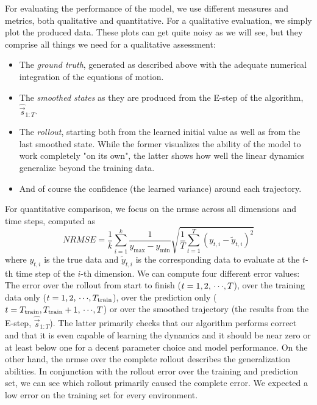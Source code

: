 	For evaluating the performance of the model, we use different measures and metrics, both qualitative and quantitative. For a qualitative evaluation, we simply plot the produced data. These plots can get quite noisy as we will see, but they comprise all things we need for a qualitative assessment:
	\begin{itemize}
		\item The \emph{ground truth}, generated as described above with the adequate numerical integration of the equations of motion.
		\item The \emph{smoothed states} as they are produced from the E-step of the \algname algorithm, \ie \(\hat{\vec{s}}_{1:T}\).
		\item The \emph{rollout}, starting both from the learned initial value as well as from the last smoothed state. While the former visualizes the ability of the model to work completely "on its own", the latter shows how well the linear dynamics generalize beyond the training data.
		\item And of course the confidence (\ie the learned variance) around each trajectory.
	\end{itemize}
	For quantitative comparison, we focus on the \ac{nrmse} across all dimensions and time steps, computed as
	\begin{equation*}
		\mathit{NRMSE} = \frac{1}{k} \sum_{i = 1}^{k} \frac{1}{y_\mathrm{max} - y_\mathrm{min}} \sqrt{ \frac{1}{T} \sum_{t = 1}^{T} (y_{t, i} - \tilde{y}_{t, i})^2 }
	\end{equation*}
	where \( y_{t, i} \) is the true data and \( \tilde{y}_{t, i} \) is the corresponding data to evaluate at the \(t\)-th time step of the \(i\)-th dimension. We can compute four different error values: The error over the rollout from start to finish (\( t = 1, 2, \,\cdots\!, T \)), over the training data only (\( t = 1, 2, \,\cdots\!, T_{\mathrm{train}} \)), over the prediction only (\( t = T_{\mathrm{train}}, T_{\mathrm{train}} + 1, \,\cdots\!, T \)) or over the smoothed trajectory (\ie the results from the E-step, \(  \hat{\vec{s}}_{1:T} \)). The latter primarily checks that our algorithm performs correct and that it is even capable of learning the dynamics and it should be near zero or at least below one for a decent parameter choice and model performance. On the other hand, the \ac{nrmse} over the complete rollout describes the generalization abilities. In conjunction with the rollout error over the training and prediction set, we can see which rollout primarily caused the complete error. We expected a low error on the training set for every environment.

